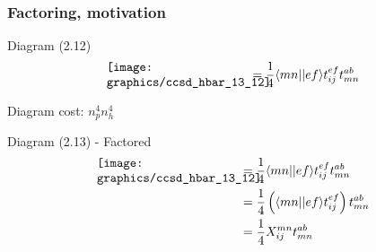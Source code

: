 \begin{frame}
    \frametitle{Factoring, motivation}

\scriptsize
\begin{block}{Diagram (2.12)}
    \begin{equation*}
        \parbox{40mm}{\texttt{[image: graphics/ccsd\_hbar\_13\_12]}}
        = \frac{1}{4}  \bra{mn}\ket{ef} t_{ij}^{ef} t_{mn}^{ab}
    \end{equation*}
\end{block}
Diagram cost: $n_p^4 n_h^4$
\begin{block}{Diagram (2.13) - Factored}
\small
    \begin{align*}
        \parbox{40mm}{\texttt{[image: graphics/ccsd\_hbar\_13\_12]}}
        &= \frac{1}{4}  \bra{mn}\ket{ef} t_{ij}^{ef} t_{mn}^{ab} \nn
        &= \frac{1}{4}  \left(\bra{mn}\ket{ef} t_{ij}^{ef}\right)  t_{mn}^{ab} \nn
        &= \frac{1}{4} X_{ij}^{mn} t_{mn}^{ab}
    \end{align*}
\end{block}
\end{frame}

